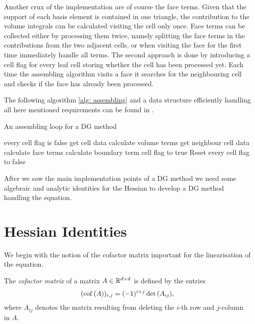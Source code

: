 Another crux of the implementation are of course the face terms. 
Given that the support of each basis element is contained in one triangle, the contribution to the volume integrals can be calculated visiting the cell only once.
Face terms can be collected either by processing them twice, namely splitting the face terms in the contributions from the two adjacent cells, or when visiting the face for the first time immediately handle all terms.
The second approach is done by introducing a cell flag for every leaf cell storing whether the cell has been processed yet. Each time the assembling algorithm visits a face it searches for the neighbouring cell and checks if the face has already been processed.

The following algorithm \ref{alg: assembling} and a data structure efficiently handling all here mentioned requirements can be found in \cite{BMV2009}.
\begin{algorithm}[H]
\caption{An assembling loop for a DG method}
\label{alg: assembling}
\begin{algorithmic}
\Ensure every cell flag is false
\State get cell data
\State calculate volume terms
					\State get neighbour cell data
					\State calculate face terms
			\EndIf
		\Else
			\State calculate boundary term
		\EndIf
\EndFor
	\State cell flag to true 
\EndFor
\State Reset every cell flag to false
\end{algorithmic}
\end{algorithm}

After we saw the main implementation points of a DG method we need some algebraic and analytic identities for the Hessian to develop a DG method handling the \MA equation.
\section{Hessian Identities}

We begin with the notion of the cofactor matrix important for the linearisation of the \MA equation.
\begin{definition} \label{def: cof matrix}
	The \emph{cofactor matrix} of a matrix $A \in \mathbb{R}^{d \times d}$ is defined by the entries
	\begin{align}
	(\operatorname{cof} \left( A \right) )_{i,j} = (-1)^{i+j} \det{\left(A_{ij}\right)},
	\end{align}
	where $A_{ij}$ denotes the matrix resulting from deleting the $i$-th row and $j$-column in $A$.
\end{definition}

